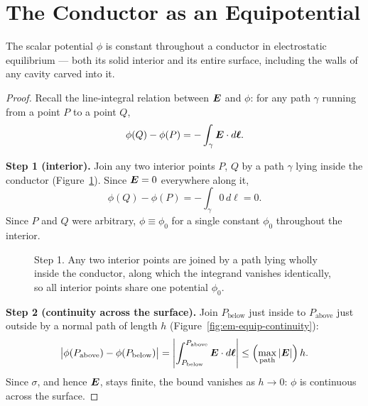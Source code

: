 \section{The Conductor as an Equipotential}

\begin{theorem}
\label{thm:em-equipotential}
The scalar potential $\phi$ is constant throughout a conductor in electrostatic equilibrium --- both its solid interior and its entire surface, including the walls of any cavity carved into it.
\end{theorem}

\begin{proof}
Recall the line-integral relation between $\vect{E}$ and $\phi$: for any path $\gamma$ running from a point $P$ to a point $Q$,
\[
    \phi(Q) - \phi(P) = -\int_\gamma \vect{E}\cdot d\vect{\ell}.
\]

\textbf{Step 1 (interior).} Join any two interior points $P$, $Q$ by a path $\gamma$ lying inside the conductor (Figure~\ref{fig:em-equip-interior}). Since $\vect{E}=0$ everywhere along it,
\[
    \phi(Q) - \phi(P) = -\int_\gamma 0\,d\ell = 0 .
\]
Since $P$ and $Q$ were arbitrary, $\phi \equiv \phi_0$ for a single constant $\phi_0$ throughout the interior.

\begin{figure}[H]
\begin{center}
\end{center}
\caption{Step 1. Any two interior points are joined by a path lying wholly inside the conductor, along which the integrand vanishes identically, so all interior points share one potential $\phi_0$.}
\label{fig:em-equip-interior}
\end{figure}

\textbf{Step 2 (continuity across the surface).} Join $P_\text{below}$ just inside to $P_\text{above}$ just outside by a normal path of length $h$ (Figure~\ref{fig:em-equip-continuity}):
\[
    \bigl|\phi(P_\text{above}) - \phi(P_\text{below})\bigr|
    = \left|\int_{P_\text{below}}^{P_\text{above}} \vect{E}\cdot d\vect{\ell}\right|
    \le \Bigl(\max_{\text{path}}|\vect{E}|\Bigr)\, h .
\]
Since $\sigma$, and hence $\vect{E}$, stays finite, the bound vanishes as $h\to 0$: $\phi$ is continuous across the surface.


\end{proof}

